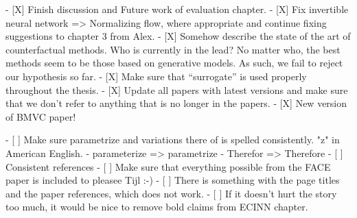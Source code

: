   - [X] Finish discussion and Future work of evaluation chapter.
  - [X] Fix invertible neural network => Normalizing flow, where appropriate and continue fixing suggestions to chapter 3 from Alex.
  - [X] Somehow describe the state of the art of counterfactual methods. Who is currently in the lead? No matter who, the best methods seem to be those based on generative models. As such, we fail to reject our hypothesis so far. 
  - [X] Make sure that ``surrogate'' is used properly throughout the thesis. 
  - [X] Update all papers with latest versions and make sure that we don't refer to anything that is no longer in the papers. 
  - [X] New version of BMVC paper!
  
  - [ ] Make sure parametrize and variations there of is spelled consistently. "z" in American English.
        - parameterize => parametrize
        - Therefor => Therefore
  - [ ] Consistent references
  - [ ] Make sure that everything possible from the FACE paper is included to pleasee Tijl :-)
  - [ ] There is something with the page titles and the paper references, which does not work.
  - [ ] If it doesn't hurt the story too much, it would be nice to remove bold claims from ECINN chapter.